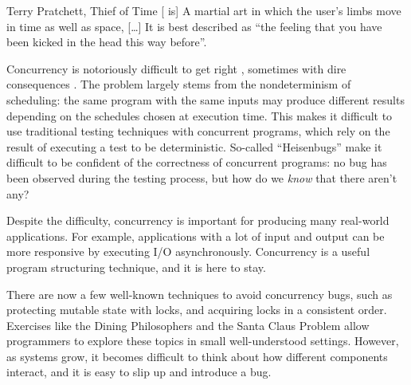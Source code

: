 \begin{chapquote}{Terry Pratchett, Thief of Time\nocite{pratchett2001}}
  [\dejafu{} is] A martial art in which the user's limbs move in time
  as well as space, [\ldots] It is best described as ``the feeling
  that you have been kicked in the head this way before''.
\end{chapquote}

Concurrency is notoriously difficult to get right \citep{overrated},
sometimes with dire consequences \citep{therac25}. The problem largely
stems from the nondeterminism of scheduling: the same program with the
same inputs may produce different results depending on the schedules
chosen at execution time. This makes it difficult to use traditional
testing techniques with concurrent programs, which rely on the result
of executing a test to be deterministic. So-called ``Heisenbugs'' make
it difficult to be confident of the correctness of concurrent
programs: no bug has been observed during the testing process, but how
do we \emph{know} that there aren't any?

Despite the difficulty, concurrency is important for producing many
real-world applications. For example, applications with a lot of input
and output can be more responsive by executing I/O asynchronously.
Concurrency is a useful program structuring technique, and it is here
to stay.

There are now a few well-known techniques to avoid concurrency bugs,
such as protecting mutable state with locks, and acquiring locks in a
consistent order. Exercises like the Dining Philosophers
\citep{diningphilosophers} and the Santa Claus Problem
\citep{santaclaus} allow programmers to explore these topics in small
well-understood settings. However, as systems grow, it becomes
difficult to think about how different components interact, and it is
easy to slip up and introduce a bug.
